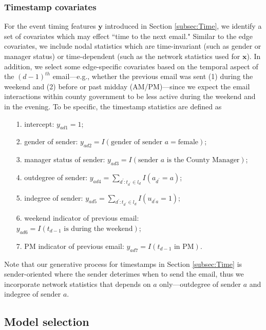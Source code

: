 \documentclass[ba]{imsart}
\numberwithin{equation}{section}
\theoremstyle{plain}
\begin{document}
	\subsubsection{Timestamp covariates}
	For the event timing features $\boldsymbol{y}$ introduced in Section \ref{subsec:Time}, we identify a set of covariates which may effect ``time to the next email." Similar to the edge covariates, we include nodal statistics which are time-invariant (such as gender or manager status) or time-dependent (such as the network statistics used for $\boldsymbol{x}$). In addition, we select some edge-specific covariates based on the temporal aspect of the $(d-1)^{th}$ email---e.g., whether the previous email was sent (1) during the weekend and (2) before or past midday (AM/PM)---since we expect the email interactions within county government to be less active during the weekend and in the evening. To be specific, the timestamp statistics are defined as
	\begin{itemize}
		\item[1.] intercept: ${y}_{ad1} =1$;
		\item[2.] gender of sender: ${y}_{ad2}=I(\mbox{gender of sender }a= \mbox{female})$;
		\item[3.] manager status of sender: ${y}_{ad3}=I(\mbox{sender }a \mbox{ is the County Manager})$;
		\item[4.] outdegree of sender: ${y}_{ad4} =\sum_{d^\prime: t_{d^\prime} \in l_d} I(a_{d^\prime} = a)$;
		\item[5.] indegree of sender: ${y}_{ad5}=\sum_{d^\prime: t_{d^\prime} \in l_d} I(u_{d^\prime a} = 1)$;
		\item[6.] weekend indicator of previous email: ${y}_{ad6} = I(t_{d-1} \mbox{ is during the } \mbox{weekend})$;
		\item[7.] PM indicator of previous email: ${y}_{ad7}= I(t_{d-1} \mbox{ in } \mbox{PM})$.
	\end{itemize}
	Note that our generative process for timestamps in Section \ref{subsec:Time} is sender-oriented where the sender deterimes when to send the email, thus we incorporate network statistics that depends on $a$ only---outdegree of sender $a$ and indegree of sender $a$.
	
	\subsection{Model selection}\label{subsec:Experiment_email}
	
\end{document}
